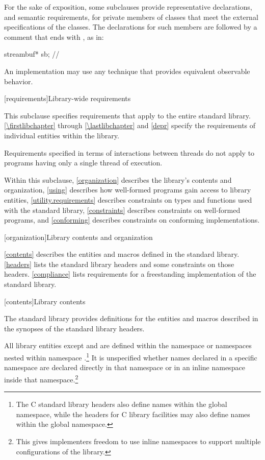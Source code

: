 \pnum
For the sake of exposition,
some subclauses provide representative declarations, and semantic requirements, for
private members of classes that meet the external specifications of the classes.
The declarations for such members are
followed by a comment that ends with \expos, as in:

\begin{codeblock}
streambuf* sb;  // \expos
\end{codeblock}

\pnum
An implementation may use any technique that provides equivalent observable behavior.

[requirements]{Library-wide requirements}

\pnum
This subclause specifies requirements that apply to the entire \Cpp{} standard library.
\ref{\firstlibchapter} through \ref{\lastlibchapter} and \ref{depr}
specify the requirements of individual entities within the library.

\pnum
Requirements specified in terms of interactions between threads do not apply to
programs having only a single thread of execution.

\pnum
Within this subclause, \ref{organization} describes the library's contents and
organization, \ref{using} describes how well-formed \Cpp{} programs gain access to library
entities,
\ref{utility.requirements} describes constraints on types and functions used with
the \Cpp{} standard library,
\ref{constraints} describes constraints on well-formed \Cpp{} programs, and
\ref{conforming} describes constraints on conforming implementations.

[organization]{Library contents and organization}

\pnum
\ref{contents} describes the entities and macros defined in the \Cpp{} standard library.
\ref{headers} lists the standard library headers and some constraints on those headers.
\ref{compliance} lists requirements for a freestanding implementation of the \Cpp{}
standard library.

[contents]{Library contents}

\pnum
The \Cpp{} standard library provides definitions
for the entities and macros described in the synopses
of the \Cpp{} standard library headers.

\pnum
All library entities except
and
are defined within the namespace
or namespaces nested within namespace
.\footnote{The C standard library headers also define
names within the global namespace, while the \Cpp{} headers for C library
facilities may also define names within the global namespace.}%
It is unspecified whether names declared in a specific namespace are declared
directly in that namespace or in an inline namespace inside that
namespace.\footnote{This gives implementers freedom to use inline namespaces to
support multiple configurations of the library.}

